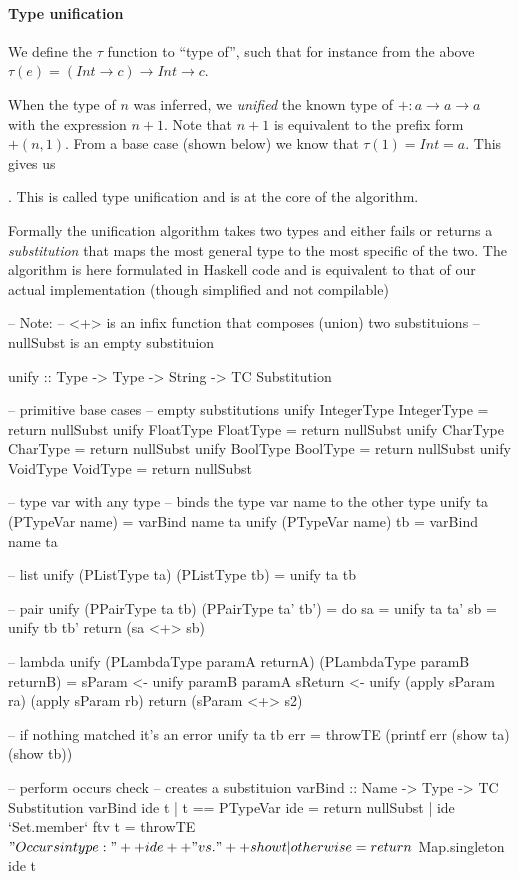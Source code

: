 \paragraph{Type unification}

We define the $\tau$ function to ``type of'', such that for instance from the above $\tau(e) = (Int \to c) \to Int \to c$.

When the type of $n$ was inferred, we \emph{unified} the known type of $+:a \to a \to a$ with the expression $n + 1$. Note that $n + 1$ is equivalent to the prefix form $+(n, 1)$. From a base case (shown below) we know that $\tau(1) = Int = a$. This gives us

. This is called type unification and is at the core of the algorithm.

Formally the unification algorithm takes two types and either fails or returns a \emph{substitution} that maps the most general type to the most specific of the two. The algorithm is here formulated in Haskell code and is equivalent to that of our actual implementation (though simplified and not compilable)

\begin{haskell}[]
-- Note:
-- <+> is an infix function that composes (union) two substituions
-- nullSubst is an empty substituion

unify :: Type -> Type -> String -> TC Substitution

-- primitive base cases
-- empty substitutions
unify IntegerType IntegerType = return nullSubst
unify FloatType FloatType     = return nullSubst
unify CharType CharType       = return nullSubst
unify BoolType BoolType       = return nullSubst
unify VoidType VoidType       = return nullSubst

-- type var with any type
-- binds the type var name to the other type
unify ta (PTypeVar name) = varBind name ta
unify (PTypeVar name) tb = varBind name ta

-- list
unify (PListType ta) (PListType tb) = unify ta tb

-- pair
unify (PPairType ta tb) (PPairType ta' tb') = do
  sa = unify ta ta'
  sb = unify tb tb'
  return (sa <+> sb)

-- lambda
unify (PLambdaType paramA returnA) (PLambdaType paramB returnB) =
  sParam <- unify paramB paramA
  sReturn <- unify (apply sParam ra) (apply sParam rb)
  return (sParam <+> s2)

-- if nothing matched it's an error
unify ta tb err = throwTE (printf err (show ta) (show tb))

-- perform occurs check
-- creates a substituion
varBind :: Name -> Type -> TC Substitution
varBind ide t | t == PTypeVar ide = return nullSubst
              | ide `Set.member` ftv t = throwTE $ "Occurs in type: " ++ ide ++ " vs. " ++ show t
              | otherwise = return $ Map.singleton ide t

\end{haskell}


